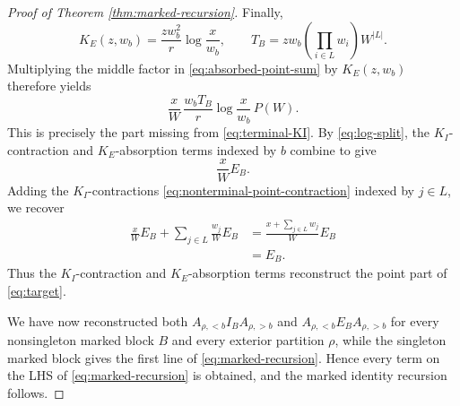\documentclass[letterpaper,12pt]{amsart}
\theoremstyle{definition}
\numberwithin{equation}{section}
\begin{document}
\begin{proof}[Proof of Theorem \ref{thm:marked-recursion}]
Finally,
\[
  K_E(z,w_b)
  =
  \frac{zw_b^2}{r}\log\frac{x}{w_b},
  \qquad
  T_B
  =
  zw_b\left(\prod_{i\in L}w_i\right)W^{|L|}.
\]
Multiplying the middle factor in \eqref{eq:absorbed-point-sum} by
\(K_E(z,w_b)\) therefore yields
\begin{equation}
  \frac{x}{W}\,
  \frac{w_bT_B}{r}
  \log\frac{x}{w_b}\,P(W).
  \label{eq:terminal-KE}
\end{equation}
This is precisely the part missing from \eqref{eq:terminal-KI}.  By
\eqref{eq:log-split}, the \(K_I\)-contraction and \(K_E\)-absorption terms
indexed by \(b\) combine to give
\[
  \frac{x}{W}E_B.
\]
Adding the $K_I$-contractions \eqref{eq:nonterminal-point-contraction} indexed by
\(j\in L\), we recover
\begin{align*}
  \frac{x}{W}E_B
  +
  \sum_{j\in L}\frac{w_j}{W}E_B
  &=
  \frac{x+\sum_{j\in L}w_j}{W}E_B\\
  &=E_B.
\end{align*}
Thus the \(K_I\)-contraction and \(K_E\)-absorption terms reconstruct the point part of \eqref{eq:target}.

We have now reconstructed both
\(A_{\rho,<b}I_BA_{\rho,>b}\) and
\(A_{\rho,<b}E_BA_{\rho,>b}\) for every nonsingleton marked block \(B\) and
every exterior partition \(\rho\), while the singleton marked block gives the
first line of \eqref{eq:marked-recursion}. Hence every term on the LHS of \eqref{eq:marked-recursion} is obtained, and the marked identity recursion follows.
\end{proof}
\end{document}

